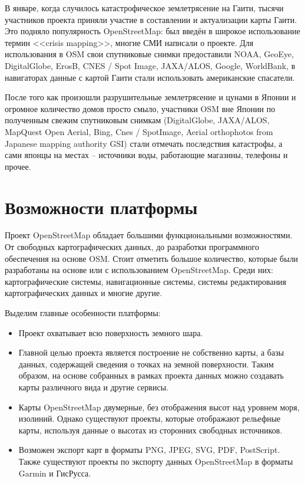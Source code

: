 В январе, когда случилось катастрофическое землетрясение на Гаити, тысячи 
участников проекта приняли участие в составлении и актуализации карты Гаити. 
Это подняло популярность OpenStreetMap: был введён в широкое использование 
термин <<crisis mapping>>, многие СМИ написали о проекте. Для использования в 
OSM свои спутниковые снимки предоставили NOAA, GeoEye, DigitalGlobe, ErosB, 
CNES / Spot Image, JAXA/ALOS, Google, WorldBank, в навигаторах данные с картой 
Гаити стали использовать американские спасатели.

После того как произошли разрушительные землетрясение и цунами в Японии и 
огромное количество домов просто смыло, участники OSM вне Японии по полученным 
свежим спутниковым снимкам (DigitalGlobe, JAXA/ALOS, MapQuest Open Aerial, 
Bing, Cnes / SpotImage, Aerial orthophotos from Japanese mapping authority 
GSI) стали отмечать последствия катастрофы, а сами японцы на местах -- 
источники воды, работающие магазины, телефоны и прочее.\cite{osmwiki}

\section{Возможности платформы}
Проект OpenStreetMap обладает большими функциональными возможностями. От 
свободных картографических данных, до разработки программного обеспечения на 
основе OSM. Стоит отметить большое количество, которые были разработаны на 
основе или с использованием OpenStreetMap. Среди них: картографические 
системы, навигационные системы, системы редактирования картографических данных 
и многие другие.\cite{osmwiki}

Выделим главные особенности платформы:
\begin{itemize}
    \item Проект охватывает всю поверхность земного шара.
    \item Главной целью проекта является построение не собственно карты, а 
        базы данных, содержащей сведения о точках на земной поверхности. Таким 
        образом, на основе собранных в рамках проекта данных можно создавать 
        карты различного вида и другие сервисы.
    \item Карты OpenStreetMap двумерные, без отображения высот над уровнем 
        моря, изолиний. Однако существуют проекты, которые отображают 
        рельефные карты, используя данные о высотах из сторонних свободных 
        источников.
    \item Возможен экспорт карт в форматы PNG, JPEG, SVG, PDF, PostScript. 
        Также существуют проекты по экспорту данных OpenStreetMap в форматы 
        Garmin и ГисРусса.
\end{itemize}

